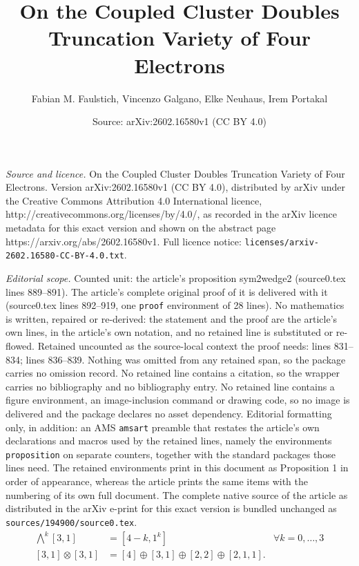 \documentclass[10pt,a4paper]{amsart}
\title{On the Coupled Cluster Doubles Truncation Variety of Four Electrons}
\author{Fabian M. Faulstich, Vincenzo Galgano, Elke Neuhaus, Irem Portakal}
\date{Source: arXiv:2602.16580v1 (CC BY 4.0)}
\begin{document}
\maketitle

\noindent\emph{Source and licence.} On the Coupled Cluster Doubles Truncation Variety of Four Electrons. Version arXiv:2602.16580v1 (CC BY 4.0), distributed by arXiv under the Creative Commons Attribution 4.0 International licence, http://creativecommons.org/licenses/by/4.0/, as recorded in the arXiv licence metadata for this exact version and shown on the abstract page https://arxiv.org/abs/2602.16580v1. Full licence notice: \texttt{licenses/arxiv-2602.16580-CC-BY-4.0.txt}.\par\smallskip

\noindent\textit{Editorial scope.} Counted unit: the article's proposition sym2wedge2 (source0.tex lines 889--891). The article's complete original proof of it is delivered with it (source0.tex lines 892--919, one \texttt{proof} environment of 28 lines). No mathematics is written, repaired or re-derived: the statement and the proof are the article's own lines, in the article's own notation, and no retained line is substituted or re-flowed.  Retained uncounted as the source-local context the proof needs: lines 831--834; lines 836--839.  Nothing was omitted from any retained span, so the package carries no omission record.  No retained line contains a citation, so the wrapper carries no bibliography and no bibliography entry.  No retained line contains a figure environment, an image-inclusion command or drawing code, so no image is delivered and the package declares no asset dependency.  Editorial formatting only, in addition: an AMS \texttt{amsart} preamble that restates the article's own declarations and macros used by the retained lines, namely the environments \texttt{proposition} on separate counters, together with the standard packages those lines need.  The retained environments print in this document as Proposition 1 in order of appearance, whereas the article prints the same items with the numbering of its own full document.  The complete native source of the article as distributed in the arXiv e-print for this exact version is bundled unchanged as \texttt{sources/194900/source0.tex}.
\begin{align}
{\textstyle \bigwedge^k}[3,1] & = [4-k,1^k] & \forall k=0,\ldots, 3 \label{eq:wedge[3,1]} \\
[3,1] \otimes [3,1] & = [4] \oplus [3,1] \oplus [2,2] \oplus [2,1,1] .\label{eq:[3,1]*[3,1]}
\end{align}
\end{document}

